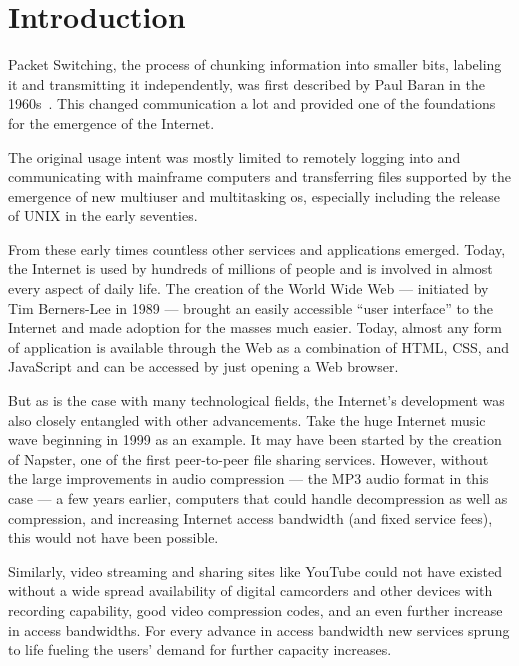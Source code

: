 \chapter{Introduction}
\label{chap:intro}

Packet Switching, the process of chunking information into smaller bits, labeling it and transmitting it independently, was first described by Paul Baran in the 1960s~\cite{baran1964distributed}. This changed communication a lot and provided one of the foundations for the emergence of the Internet. 

The original usage intent was mostly limited to remotely logging into and communicating with mainframe computers and transferring files supported by the emergence of new multiuser and multitasking \gls{os}, especially including the release of UNIX in the early seventies.

From these early times countless other services and applications emerged. Today, the Internet is used by hundreds of millions of people and is involved in almost every aspect of daily life. The creation of the World Wide Web --- initiated by Tim Berners-Lee in 1989 --- brought an easily accessible ``user interface'' to the Internet and made adoption for the masses much easier. Today, almost any form of application is available through the Web as a combination of \gls{HTML}, \gls{CSS}, and JavaScript and can be accessed by just opening a Web browser.

But as is the case with many technological fields, the Internet's development was also closely entangled with other advancements. Take the huge Internet music wave beginning in 1999 as an example. It may have been started by the creation of Napster, one of the first peer-to-peer file sharing services. However, without the large improvements in audio compression --- the MP3 audio format in this case --- a few years earlier, computers that could handle decompression as well as compression, and increasing Internet access bandwidth (and fixed service fees), this would not have been possible. 

Similarly, video streaming and sharing sites like YouTube could not have existed without a wide spread availability of digital camcorders and other devices with recording capability, good video compression codes, and an even further increase in access bandwidths. For every advance in access bandwidth new services sprung to life fueling the users' demand for further capacity increases. 

